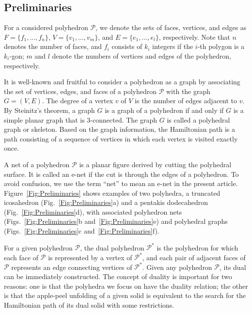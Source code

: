 \documentclass[12pt]{article}
\theoremstyle{plain}
\theoremstyle{definition}
\theoremstyle{remark}
\begin{document}
\subsection{Preliminaries}

For a considered polyhedron $\mathcal{P}$, we denote the sets of faces,
vertices, and edges as $F=\{f_1, \ldots, f_n\}$,
$V=\{v_1, \ldots, v_m\}$, and $E=\{e_1, \ldots, e_l\}$, respectively.
Note that $n$ denotes the number of faces, and $f_i$ consists of $k_i$
integers if the $i$-th polygon is a $k_i$-gon; $m$ and $l$ denote the
numbers of vertices and edges of the polyhedron, respectively.

It is well-known and fruitful to consider a polyhedron as a graph by
associating the set of vertices, edges, and faces of a polyhedron
$\mathcal{P}$ with the graph $G=(V, E)$.
The degree of a vertex $v$ of $V$ is the number of edges adjacent to $v$.
By Steinitz's theorem, a graph $G$ is a graph of a polyhedron if and only
if $G$ is a simple planar graph that is 3-connected.
The graph $G$ is called a polyhedral graph or skeleton.
Based on the graph information, the Hamiltonian path is a path consisting
of a sequence of vertices in which each vertex is visited exactly once.

A net of a polyhedron $\mathcal{P}$ is a planar figure derived by cutting
the polyhedral surface.
It is called an e-net if the cut is through the edges of a polyhedron.
To avoid confusion, we use the term ``net'' to mean an e-net in the
present article.
Figure~\ref{Fig:Preliminaries} shows examples of two polyhedra,
a truncated icosahedron (Fig.~\ref{Fig:Preliminaries}a) and a pentakis
dodecahedron (Fig.~\ref{Fig:Preliminaries}d), with associated polyhedron
nets (Figs.~\ref{Fig:Preliminaries}b and~\ref{Fig:Preliminaries}e) and
polyhedral graphs (Figs.~\ref{Fig:Preliminaries}c
and~\ref{Fig:Preliminaries}f).

For a given polyhedron $\mathcal{P}$, the dual polyhedron $\mathcal{P}^*$
is the polyhedron for which each face of $\mathcal{P}$ is represented by a
vertex of $\mathcal{P}^*$, and each pair of adjacent faces of $\mathcal{P}$
represents an edge connecting vertices of $\mathcal{P}^*$.
Given any polyhedron $\mathcal{P}$, its dual can be immediately constructed.
The concept of duality is important for two reasons: one is that the
polyhedra we focus on have the duality relation; the other is that the
apple-peel unfolding of a given solid is equivalent to the search for the
Hamiltonian path of its dual solid with some restrictions.
\end{document}
